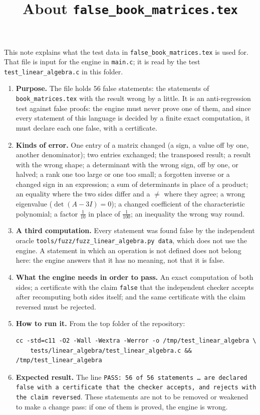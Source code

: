 \documentclass[11pt,a4paper]{article}
\title{About \texttt{false\_book\_matrices.tex}}
\author{}
\date{}
\begin{document}
\maketitle
This note explains what the test data in \texttt{false\_book\_matrices.tex} is used for. That file is input for the engine in \texttt{main.c}; it is read by the test \texttt{test\_linear\_algebra.c} in this folder.

\begin{enumerate}
\item \textbf{Purpose.} The file holds 56 false statements: the statements of \texttt{book\_matrices.tex} with the result wrong by a little. It is an anti-regression test against false proofs: the engine must never prove one of them, and since every statement of this language is decided by a finite exact computation, it must declare each one false, with a certificate.

\item \textbf{Kinds of error.} One entry of a matrix changed (a sign, a value off by one, another denominator); two entries exchanged; the transposed result; a result with the wrong shape; a determinant with the wrong sign, off by one, or halved; a rank one too large or one too small; a forgotten inverse or a changed sign in an expression; a sum of determinants in place of a product; an equality where the two sides differ and a $\neq$ where they agree; a wrong eigenvalue ($\det(A - 3I) = 0$); a changed coefficient of the characteristic polynomial; a factor $\frac{1}{10}$ in place of $\frac{1}{100}$; an inequality the wrong way round.

\item \textbf{A third computation.} Every statement was found false by the independent oracle \texttt{tools/fuzz/fuzz\_linear\_algebra.py data}, which does not use the engine. A statement in which an operation is not defined does not belong here: the engine answers that it has no meaning, not that it is false.

\item \textbf{What the engine needs in order to pass.} An exact computation of both sides; a certificate with the claim \texttt{false} that the independent checker accepts after recomputing both sides itself; and the same certificate with the claim reversed must be rejected.

\item \textbf{How to run it.} From the top folder of the repository:
\begin{verbatim}
cc -std=c11 -O2 -Wall -Wextra -Werror -o /tmp/test_linear_algebra \
    tests/linear_algebra/test_linear_algebra.c && /tmp/test_linear_algebra
\end{verbatim}

\item \textbf{Expected result.} The line \texttt{PASS: 56 of 56 statements \dots{} are declared false with a certificate that the checker accepts, and rejects with the claim reversed}. These statements are not to be removed or weakened to make a change pass: if one of them is proved, the engine is wrong.
\end{enumerate}
\end{document}
